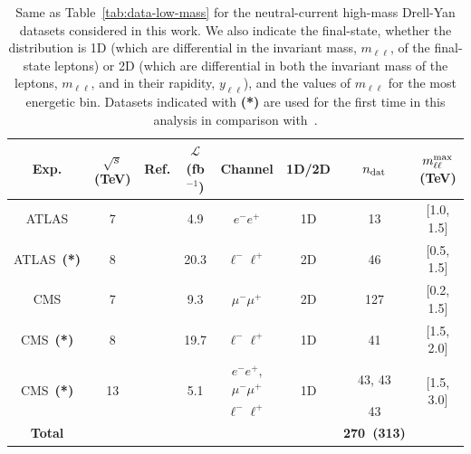 \documentclass[withindex,glossary]{cam-thesis}
\begin{document}
\begin{table}[t]
  \renewcommand{\arraystretch}{1.20}
\begin{center}
\small
\begin{tabular}{cccccccc}
 \toprule
 Exp.   & $\sqrt{s}$ (TeV) & Ref. & $\mathcal{L}$ (fb$^{-1}$) & Channel & 1D/2D & $n_{\rm dat}$ & $m_{\ell\ell}^{\rm max}$ (TeV) \\
 \midrule
 ATLAS  & 7    & \cite{Aad:2013iua}         & 4.9   & $e^{-}e^{+}$									& 1D & 13 & [1.0, 1.5] \\
 ATLAS~{\bf (*)}  & 8    & \cite{Aad:2016zzw}         & 20.3  & $\ell^{-}\ell^{+}$									& 2D & 46 & [0.5, 1.5] \\
 \midrule
 CMS    & 7    & \cite{Chatrchyan:2013tia}  & 9.3   & $\mu^{-}\mu^{+}$								& 2D & 127 & [0.2, 1.5] \\
 CMS~{\bf (*)}    & 8    & \cite{CMS:2014jea}         & 19.7  & $\ell^{-}\ell^{+}$									& 1D & 41 & [1.5, 2.0] \\
  \midrule
 \multirow{2}{*}{ CMS~{\bf (*)}}    & \multirow{2}{*}{13}   & \multirow{2}{*}{\cite{Sirunyan:2018owv}}    & \multirow{2}{*}{5.1}   & $e^{-}e^{+}$, $\mu^{-}\mu^{+}$	& \multirow{2}{*}{1D} & 43, 43 & \multirow{2}{*}{[1.5, 3.0]} \\
 &  &   &    &   $\ell^{-}\ell^{+}$  &    & 43    &   \\
 \midrule
 {\bf Total}  &  &     &     &     &  & {\bf 270~(313)} \\
 \bottomrule
\end{tabular}
\end{center}
\caption{\small Same as Table~\ref{tab:data-low-mass} for the neutral-current high-mass Drell-Yan datasets
  considered in this work.
  We also indicate the final-state, whether the distribution is 1D (which are differential in 
the invariant mass, $m_{\ell\ell}$, of the final-state leptons) or 2D (which are differential in both the invariant mass of the 
leptons, $m_{\ell\ell}$, and in their rapidity, $y_{\ell\ell}$), and the values
  of $m_{\ell\ell}$ for the most energetic bin.
  Datasets indicated with {\bf (*)} are used for the first time in this analysis
  in comparison with~\cite{Faura:2020oom}.
}
\label{tab:data-high-mass}
\end{table}
\end{document}
